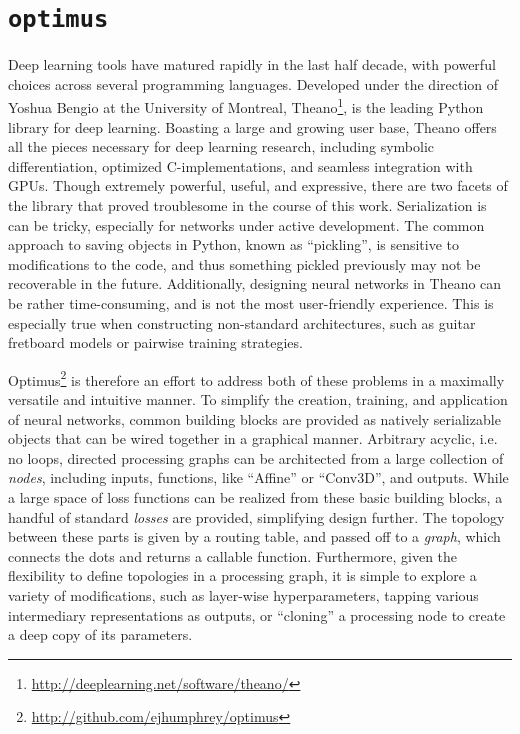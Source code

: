\section{\texttt{optimus}}
\label{sec:optimus}

Deep learning tools have matured rapidly in the last half decade, with powerful choices across several programming languages.
Developed under the direction of Yoshua Bengio at the University of Montreal, Theano\footnote{\url{http://deeplearning.net/software/theano/}}, is the leading Python library for deep learning.
Boasting a large and growing user base, Theano offers all the pieces necessary for deep learning research, including symbolic differentiation, optimized C-implementations, and seamless integration with GPUs.
Though extremely powerful, useful, and expressive, there are two facets of the library that proved troublesome in the course of this work.
Serialization is can be tricky, especially for networks under active development.
The common approach to saving objects in Python, known as ``pickling'', is sensitive to modifications to the code, and thus something pickled previously may not be recoverable in the future.
Additionally, designing neural networks in Theano can be rather time-consuming, and is not the most user-friendly experience.
This is especially true when constructing non-standard architectures, such as guitar fretboard models or pairwise training strategies.

Optimus\footnote{\url{http://github.com/ejhumphrey/optimus}} is therefore an effort to address both of these problems in a maximally versatile and intuitive manner.
To simplify the creation, training, and application of neural networks, common building blocks are provided as natively serializable objects that can be wired together in a graphical manner.
Arbitrary acyclic, i.e. no loops, directed processing graphs can be architected from a large collection of \emph{nodes}, including inputs, functions, like ``Affine'' or ``Conv3D'', and outputs.
While a large space of loss functions can be realized from these basic building blocks, a handful of standard \emph{losses} are provided, simplifying design further.
The topology between these parts is given by a routing table, and passed off to a \emph{graph}, which connects the dots and returns a callable function.
Furthermore, given the flexibility to define topologies in a processing graph, it is simple to explore a variety of modifications, such as layer-wise hyperparameters, tapping various intermediary representations as outputs, or ``cloning'' a processing node to create a deep copy of its parameters.

